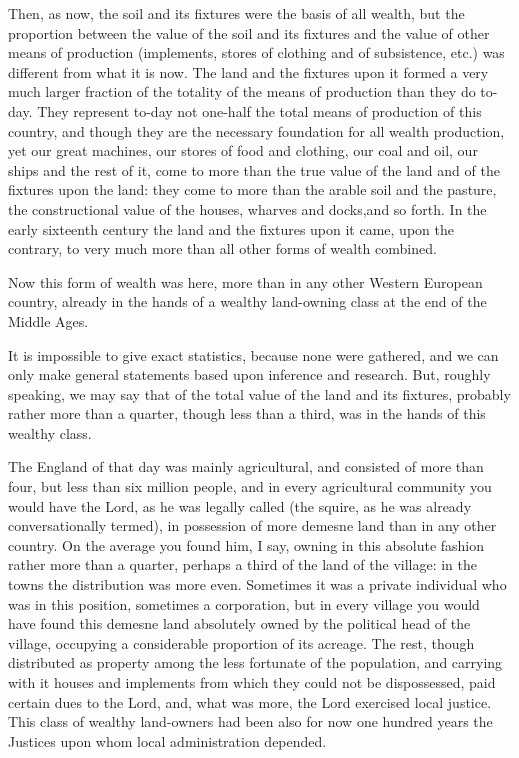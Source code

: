 \documentclass{book}
\begin{document}
Then, as now, the soil and its fixtures were the basis of all wealth, but the proportion between the value of the soil and its fixtures and the value of other means of production (implements, stores of clothing and of subsistence, etc.) was different from what it is now. The land and the fixtures upon it formed a very much larger fraction of the totality of the means of production than they do to-day. They represent to-day not one-half the total means of production of this country, and though they are the necessary foundation for all wealth production, yet our great machines, our stores of food and clothing, our coal and oil, our ships and the rest of it, come to more than the true value of the land and of the fixtures upon the land: they come to more than the arable soil and the pasture, the constructional value of the houses, wharves and docks,and so forth. In the early sixteenth century the land and the fixtures upon it came, upon the contrary, to very much more than all other forms of wealth combined.

Now this form of wealth was here, more than in any other Western European country, already in the hands of a wealthy land-owning class at the end of the Middle Ages.

It is impossible to give exact statistics, because none were gathered, and we can only make general statements based upon inference and research. But, roughly speaking, we may say that of the total value of the land and its fixtures, probably rather more than a quarter, though less than a third, was in the hands of this wealthy class.

The England of that day was mainly agricultural, and consisted of more than four, but less than six million people, and in every agricultural community you would have the Lord, as he was legally called (the squire, as he was already conversationally termed), in possession of more demesne land than in any other country. On the average you found him, I say, owning in this absolute fashion rather more than a quarter, perhaps a third of the land of the village: in the towns the distribution was more even. Sometimes it was a private individual who was in this position, sometimes a corporation, but in every village you would have found this demesne land absolutely owned by the political head of the village, occupying a considerable proportion of its acreage. The rest, though distributed as property among the less fortunate of the population, and carrying with it houses and implements from which they could not be dispossessed, paid certain dues to the Lord, and, what was more, the Lord exercised local justice. This class of wealthy land-owners had been also for now one hundred years the Justices upon whom local administration depended.
\end{document}
